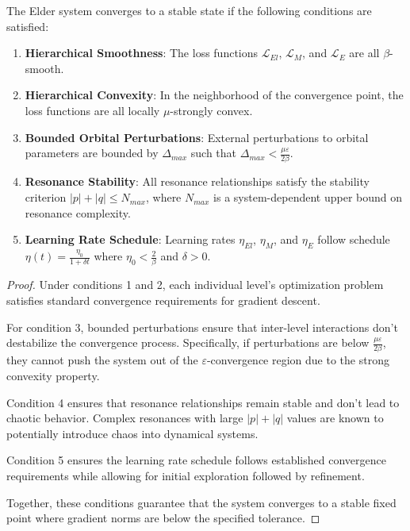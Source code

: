 \begin{theorem}
The Elder system converges to a stable state if the following conditions are satisfied:
\begin{enumerate}
    \item \textbf{Hierarchical Smoothness}: The loss functions $\mathcal{L}_{El}$, $\mathcal{L}_{M}$, and $\mathcal{L}_{E}$ are all $\beta$-smooth.
    \item \textbf{Hierarchical Convexity}: In the neighborhood of the convergence point, the loss functions are all locally $\mu$-strongly convex.
    \item \textbf{Bounded Orbital Perturbations}: External perturbations to orbital parameters are bounded by $\Delta_{max}$ such that $\Delta_{max} < \frac{\mu \varepsilon}{2\beta}$.
    \item \textbf{Resonance Stability}: All resonance relationships satisfy the stability criterion $|p| + |q| \leq N_{max}$, where $N_{max}$ is a system-dependent upper bound on resonance complexity.
    \item \textbf{Learning Rate Schedule}: Learning rates $\eta_{El}$, $\eta_M$, and $\eta_E$ follow schedule $\eta(t) = \frac{\eta_0}{1 + \delta t}$ where $\eta_0 < \frac{2}{\beta}$ and $\delta > 0$.
\end{enumerate}
\end{theorem}

\begin{proof}
Under conditions 1 and 2, each individual level's optimization problem satisfies standard convergence requirements for gradient descent.

For condition 3, bounded perturbations ensure that inter-level interactions don't destabilize the convergence process. Specifically, if perturbations are below $\frac{\mu \varepsilon}{2\beta}$, they cannot push the system out of the $\varepsilon$-convergence region due to the strong convexity property.

Condition 4 ensures that resonance relationships remain stable and don't lead to chaotic behavior. Complex resonances with large $|p|+|q|$ values are known to potentially introduce chaos into dynamical systems.

Condition 5 ensures the learning rate schedule follows established convergence requirements while allowing for initial exploration followed by refinement.

Together, these conditions guarantee that the system converges to a stable fixed point where gradient norms are below the specified tolerance.
\end{proof}

